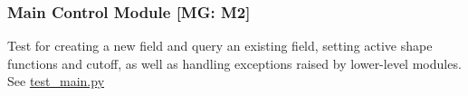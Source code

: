\documentclass[12pt, titlepage]{article}
\begin{document}


\subsubsection{Main Control Module [MG: M2]} \label{UT:Main}

Test for creating a new field and query an existing field, setting active shape functions and cutoff, as well as handling exceptions raised by lower-level modules. See \href{https://github.com/omltcat/turbulent-flow/blob/main/test/test_main.py}{test\_main.py}


\end{document}
